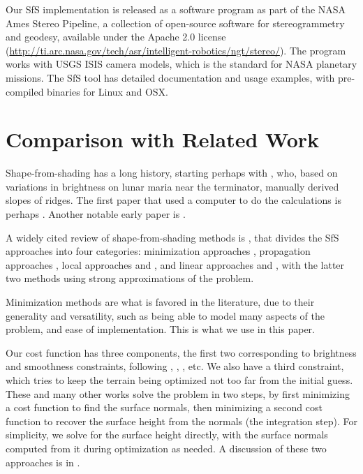 \documentclass[12pt,oneside]{article}
\begin{document}
Our SfS implementation is released as a software program as part of the
NASA Ames Stereo Pipeline, a collection of open-source software for
stereogrammetry and geodesy, available under the Apache 2.0 license
(\url{http://ti.arc.nasa.gov/tech/asr/intelligent-robotics/ngt/stereo/}). The
program works with USGS ISIS camera models, which is the standard for
NASA planetary missions. The SfS tool has detailed documentation and
usage examples, with pre-compiled binaries for Linux and OSX.

\section{Comparison with Related Work}
\label{comp}


Shape-from-shading has a long history, starting perhaps with
\citep{van1951photometric}, who, based on variations in brightness on
lunar maria near the terminator, manually derived slopes of ridges.
The first paper that used a computer to do the calculations is perhaps
\citep{rindfleisch1966photometric}. Another notable early paper is \cite{Kirk:1977fk}.


A widely cited review of shape-from-shading methods is
\cite{zhang1999shape}, that divides the SfS approaches into four
categories: minimization approaches \cite{ikeuchi1981numerical},
propagation approaches \cite{horn1970shape}, local approaches
\cite{pentland1984local} and \cite{lee1985improved}, and linear approaches
\cite{pentland1989shape} and \cite{tsai1992fast}, with the latter two
methods using strong approximations of the problem.

Minimization methods are what is favored in the literature, due to their
generality and versatility, such as being able to model many aspects of
the problem, and ease of implementation. This is what we use in this
paper.

Our cost function has three components, the first two corresponding to brightness and
smoothness constraints, following \cite{ikeuchi1981numerical},
\cite{horn1990height}, \cite{lee1993shape}, etc. We also have a third constraint,
which tries to keep the terrain being optimized not too far from the initial guess. 
These and many other
works solve the problem in two steps, by first minimizing a cost
function to find the surface normals, then minimizing a second cost
function to recover the surface height from the normals (the integration
step).  For simplicity, we solve for the surface height directly, with
the surface normals computed from it during optimization as needed. A
discussion of these two approaches is in
\cite{crouzil2003multiresolution}.
\end{document}
